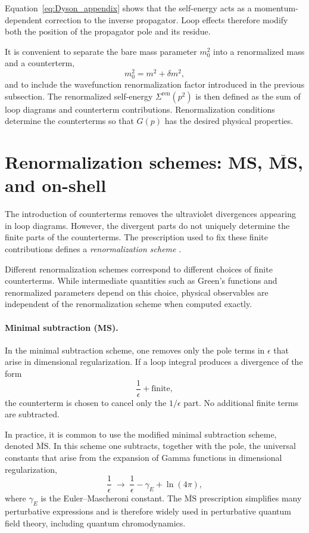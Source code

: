 Equation~\eqref{eq:Dyson_appendix} shows that the self-energy acts as
a momentum-dependent correction to the inverse propagator.
Loop effects therefore modify both the position of the propagator pole
and its residue.

It is convenient to separate the bare mass parameter $m_0^2$ into a
renormalized mass and a counterterm,
\begin{equation}
m_0^2 = m^2 + \delta m^2 ,
\end{equation}
and to include the wavefunction renormalization factor introduced in
the previous subsection.
The renormalized self-energy $\Sigma^{\mathrm{ren}}(p^2)$ is then defined
as the sum of loop diagrams and counterterm contributions.
Renormalization conditions determine the counterterms so that
$G(p)$ has the desired physical properties.

\section*{Renormalization schemes: MS, $\overline{\mathbf{MS}}$, and on-shell}

The introduction of counterterms removes the ultraviolet divergences
appearing in loop diagrams.
However, the divergent parts do not uniquely determine the finite parts
of the counterterms.
The prescription used to fix these finite contributions defines a
\emph{renormalization scheme}
\cite{PeskinSchroeder1995,WeinbergQFT}.

Different renormalization schemes correspond to different choices of
finite counterterms.
While intermediate quantities such as Green's functions and
renormalized parameters depend on this choice, physical observables
are independent of the renormalization scheme when computed exactly.

\paragraph{Minimal subtraction (MS).}

In the minimal subtraction scheme, one removes only the pole terms
in $\epsilon$ that arise in dimensional regularization.
If a loop integral produces a divergence of the form
\begin{equation}
\frac{1}{\epsilon} + \text{finite},
\end{equation}
the counterterm is chosen to cancel only the $1/\epsilon$ part.
No additional finite terms are subtracted.

In practice, it is common to use the modified minimal subtraction
scheme, denoted $\overline{\mathrm{MS}}$.
In this scheme one subtracts, together with the pole,
the universal constants that arise from the expansion of Gamma
functions in dimensional regularization,
\begin{equation}
\frac{1}{\epsilon}
\;\longrightarrow\;
\frac{1}{\epsilon}
- \gamma_E
+ \ln(4\pi),
\end{equation}
where $\gamma_E$ is the Euler–Mascheroni constant.
The $\overline{\mathrm{MS}}$ prescription simplifies many perturbative
expressions and is therefore widely used in perturbative quantum field
theory, including quantum chromodynamics.

